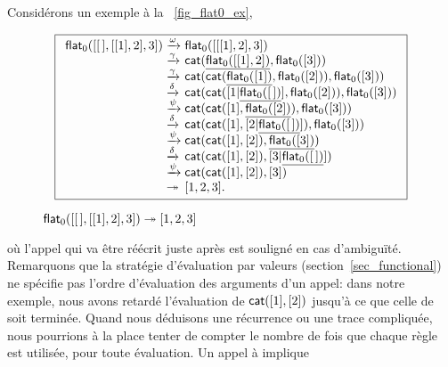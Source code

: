 Considérons un exemple à la \fig~\vref{fig_flat0_ex},
\begin{figure}
\begin{equation*}
\boxed{%
\begin{array}{r@{\;}l@{\;}l}
\fun{flat}_0([\el,[[1],2],3])
& \xrightarrow{\smash{\omega}} 
& \fun{flat}_0([[[1],2],3])\\
& \xrightarrow{\smash{\gamma}}
& \fun{cat}(\underline{\fun{flat}_0([[1],2])},\fun{flat}_0([3]))\\
& \xrightarrow{\smash{\gamma}}
& \fun{cat}(\fun{cat}(\underline{\fun{flat}_0([1])},\fun{flat}_0([2])),\fun{flat}_0([3]))\\
& \xrightarrow{\smash{\delta}}
& \fun{cat}(\fun{cat}([1|\underline{\fun{flat}_0(\el)}],\fun{flat}_0([2])),\fun{flat}_0([3]))\\
& \xrightarrow{\smash{\psi}}
& \fun{cat}(\fun{cat}([1],\underline{\fun{flat}_0([2])}),\fun{flat}_0([3]))\\
& \xrightarrow{\smash{\delta}}
& \fun{cat}(\fun{cat}([1],[2|\underline{\fun{flat}_0(\el)}]),\fun{flat}_0([3]))\\
& \xrightarrow{\smash{\psi}}
& \fun{cat}(\fun{cat}([1],[2]),\underline{\fun{flat}_0([3])})\\
& \xrightarrow{\smash{\delta}}
& \fun{cat}(\fun{cat}([1],[2]),[3|\underline{\fun{flat}_0(\el)}])\\
& \xrightarrow{\smash{\psi}}
& \fun{cat}(\fun{cat}([1],[2]),[3])\\
& \twoheadrightarrow & [1,2,3].
\end{array}
}
\end{equation*}
\caption{\(\textsf{flat}_0([[\,],[[1],2],3]) \twoheadrightarrow [1,2,3]\)
\label{fig_flat0_ex}}
\end{figure}
où l'appel qui va être réécrit juste après est souligné en cas
d'ambiguïté. Remarquons que la stratégie d'évaluation par
valeurs
(section~\ref{sec_functional}) ne spécifie pas l'ordre d'évaluation
des arguments d'un appel: dans notre exemple, nous avons retardé
l'évaluation de \(\textsf{cat}([1],[2])\) 
jusqu'à ce que celle de
 soit terminée. Quand
nous déduisons une récurrence ou une trace compliquée, nous pourrions
à la place tenter de compter le nombre de fois que chaque règle est
utilisée, pour toute évaluation. Un appel à
 implique
